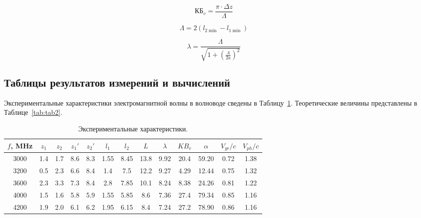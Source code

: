 \documentclass[11pt,a4paper,oneside, reqno]{amsproc}
\begin{document}
\begin{equation}
    КБ_v = \frac{\pi\cdot \Delta z}{\Lambda}
    \label{eq:kbv}
\end{equation}

\begin{equation}
    \Lambda = 2 (l_{2\min} - l_{1\min} ) 
    \label{eq:Lambda}
\end{equation}

\begin{equation}
\lambda = \frac{\Lambda}{\sqrt{1 +
            \left( \frac{\Lambda}{2a} \right)^2}}
\end{equation}

\subsection{Таблицы результатов измерений и вычислений}
Экспериментальные характеристики электромагнитной волны в волноводе
сведены в Таблицу~\ref{tab:tab1}. Теоретические величины 
представлены в Таблице~\ref{tab:tab2}.\\

\begin{centering}
\begin{table}[h!]
\vspace{10pt}
\begin{tabular}{ccccccccccccc} \toprule %
\newcolumntype{W}{D{.}{.}{2.3}}
$f$, MHz  &  $z_1$   &  $z_2$   &  $z_1'$  &  $z_2'$  &  $l_1$    &  $l_2$    &  $L$     &  $\lambda$   &  $KB_v$     &  $\alpha$    &  $V_{gr}/c$    &  $V_{ph}/c$    \\
 \midrule
3000  &  1.4  &  1.7  &  8.6  &  8.3  &  1.55  &  8.45  &  13.8  &  9.92  &  20.4  &  59.20  &  0.72  &  1.38  \\
3200  &  0.5  &  2.3  &  6.6  &  8.4  &  1.4   &  7.5   &  12.2  &  9.27  &  4.29  &  12.44  &  0.75  &  1.32  \\
3600  &  2.3  &  3.3  &  7.3  &  8.4  &  2.8   &  7.85  &  10.1  &  8.24  &  8.38  &  24.26  &  0.81  &  1.22  \\
4000  &  1.5  &  1.6  &  5.8  &  5.9  &  1.55  &  5.85  &  8.6   &  7.36  &  27.4  &  79.34  &  0.85  &  1.16  \\
4200  &  1.9  &  2.0  &  6.1  &  6.2  &  1.95  &  6.15  &  8.4   &  7.24  &  27.2  &  78.90  &  0.86  &  1.16  \\
\bottomrule
\end{tabular}
\vspace{5 pt}
\caption{Экспериментальные характеристики.} 
\label{tab:tab1}
\end{table}
\end{centering}
\end{document}
